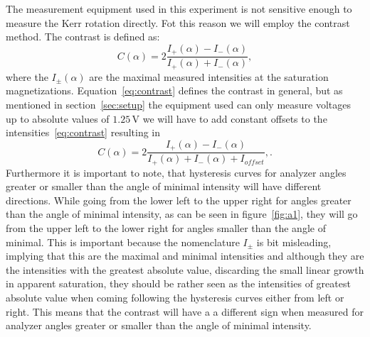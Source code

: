\documentclass[a4paper,10pt]{scrartcl}
\begin{document}
The measurement equipment used in this experiment is not sensitive enough to measure the Kerr rotation directly. Fot this reason we will employ the contrast method. The contrast is defined as:
\begin{equation}
C(\alpha) = 2 \frac{I_{+}(\alpha) - I_{-}(\alpha)}{I_{+}(\alpha) + I_{-}(\alpha)}, \label{eq:contrast}
\end{equation}
where the $I_{\pm}(\alpha)$ are the maximal measured intensities at the saturation magnetizations. Equation~\eqref{eq:contrast} defines the contrast in general, but as mentioned in section~\ref{sec:setup} the equipment used can only measure voltages up to absolute values of $1.25\,$V we will have to add constant offsets to the intensities~\eqref{eq:contrast} resulting in
\begin{equation}
C(\alpha) = 2 \frac{I_{+}(\alpha) - I_{-}(\alpha)}{I_{+}(\alpha) + I_{-}(\alpha) + I_{offset}}, \label{eq:contrast2}.
\end{equation}
Furthermore it is important to note, that hysteresis curves for analyzer angles greater or smaller than the angle of minimal intensity will have different directions. While going from the lower left to the upper right for angles greater than the angle of minimal intensity, as can be seen in figure~\ref{fig:a1}, they will go from the upper left to the lower right for angles smaller than the angle of minimal. This is important because the nomenclature $I_{\pm}$ is bit misleading, implying that this are the maximal and minimal intensities and although they are the intensities with the greatest absolute value, discarding the small linear growth in apparent saturation, they should be rather seen as the intensities of greatest absolute value when coming following the hysteresis curves either from left or right. This means that the contrast will have a a different sign when measured for analyzer angles greater or smaller than the angle of minimal intensity.
\end{document}
